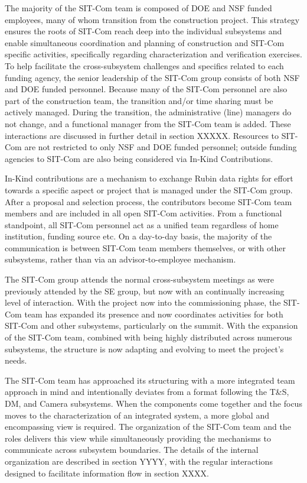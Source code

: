 \documentclass[SE,toc]{lsstdoc}
\begin{document}
The majority of the SIT-Com team is composed of DOE and NSF funded employees, many of whom transition from the construction project.
This strategy ensures the roots of SIT-Com reach deep into the individual subsystems and enable simultaneous coordination and planning of construction and SIT-Com specific activities, specifically regarding characterization and verification exercises.
To help facilitate the cross-subsystem challenges and specifics related to each funding agency, the senior leadership of the SIT-Com group consists of both NSF and DOE funded personnel.
Because many of the SIT-Com personnel are also part of the construction team, the transition and/or time sharing must be actively managed.
During the transition, the administrative (line) managers do not change, and a functional manager from the SIT-Com team is added.
These interactions are discussed in further detail in section XXXXX.
Resources to SIT-Com are not restricted to only NSF and DOE funded personnel; outside funding agencies to SIT-Com are also being considered via In-Kind Contributions.

 In-Kind contributions are a mechanism to exchange Rubin data rights for effort towards a specific aspect or project that is managed under the SIT-Com group.
After a proposal and selection process, the contributors become SIT-Com team members and are included in all open SIT-Com activities.
From a functional standpoint, all SIT-Com personnel act as a unified team regardless of home institution, funding source etc.
On a day-to-day basis, the majority of the communication is between SIT-Com team members themselves, or with other subsystems, rather than via an advisor-to-employee mechanism.

The SIT-Com group attends the normal cross-subsystem meetings as were previously attended by the SE group, but now with an continually increasing level of interaction.
With the project now into the commissioning phase, the SIT-Com team has expanded its presence and now coordinates activities for both SIT-Com and other subsystems, particularly on the summit.
With the expansion of the SIT-Com team, combined with being highly distributed across numerous subsystems, the structure is now adapting and evolving to meet the project's needs.

The SIT-Com team has approached its structuring with a more integrated team approach in mind and intentionally deviates from a format following the T\&S, DM, and Camera subsystems.
When the components come together and the focus moves to the characterization of an integrated system, a more global and encompassing view is required.
The organization of the SIT-Com team and the roles delivers this view while simultaneously providing the mechanisms to communicate across subsystem boundaries.
The details of the internal organization are described in section YYYY, with the regular interactions designed to facilitate information flow in section XXXX.
\end{document}
